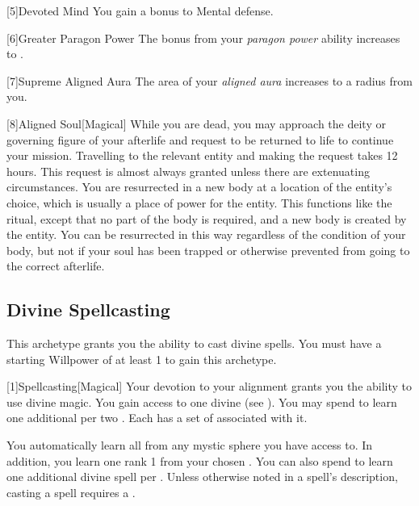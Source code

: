         [5]{Devoted Mind} You gain a  bonus to Mental defense.

        [6]{Greater Paragon Power} The bonus from your \textit{paragon power} ability increases to .

        [7]{Supreme Aligned Aura}
        The area of your \textit{aligned aura} increases to a \arealarge radius  from you.

        [8]{Aligned Soul}[Magical]
        While you are dead, you may approach the deity or governing figure of your afterlife and request to be returned to life to continue your mission.
        Travelling to the relevant entity and making the request takes 12 hours.
        This request is almost always granted unless there are extenuating circumstances.
        You are resurrected in a new body at a location of the entity's choice, which is usually a place of power for the entity.
        This functions like the  ritual, except that no part of the body is required, and a new body is created by the entity.
        You can be resurrected in this way regardless of the condition of your body, but not if your soul has been trapped or otherwise prevented from going to the correct afterlife.

    \subsection{Divine Spellcasting}
        This archetype grants you the ability to cast divine spells.
        You must have a starting Willpower of at least 1 to gain this archetype.

        [1]{Spellcasting}[Magical]
        Your devotion to your alignment grants you the ability to use divine magic.
        You gain access to one divine  (see ).
        You may spend  to learn one additional  per two .
        Each  has a set of  associated with it.

        You automatically learn all  from any mystic sphere you have access to.
        In addition, you learn one rank 1  from your chosen .
        You can also spend  to learn one additional divine spell per .
        Unless otherwise noted in a spell's description, casting a spell requires a .


